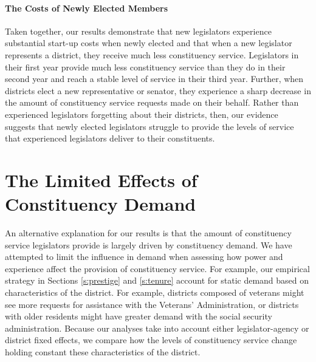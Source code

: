 \documentclass[12pt]{article}
\begin{document}
\paragraph{The Costs of Newly Elected Members} Taken together, our results demonstrate that new legislators experience substantial start-up costs when newly elected and that when a new legislator represents a district, they receive much less constituency service. Legislators in their first year provide much less constituency service than they do in their second year and reach a stable level of service in their third year. Further, when districts elect a new representative or senator, they experience a sharp decrease in the amount of constituency service requests made on their behalf. Rather than experienced legislators forgetting about their districts, then, our evidence suggests that newly elected legislators struggle to provide the levels of service that experienced legislators deliver to their constituents.  
 


\section{The Limited Effects of Constituency Demand}\label{s:demand} 

An alternative explanation for our results is that the amount of constituency service legislators provide is largely driven by constituency demand. We have attempted to limit the influence in demand when assessing how power and experience affect the provision of constituency service. For example, our empirical strategy in Sections \ref{s:prestige} and \ref{s:tenure} account for static demand based on characteristics of the district. For example, districts composed of veterans might see more requests for assistance with the Veterans' Administration, or districts with older residents might have greater demand with the social security administration. Because our analyses take into account either legislator-agency or district fixed effects, we compare how the levels of constituency service change holding constant these characteristics of the district.  
\end{document}
